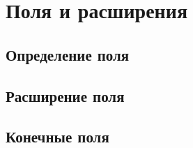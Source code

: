 \section{Поля и расширения}
\subsection{Определение поля}
\subsection{Расширение поля}
\subsection{Конечные поля}
